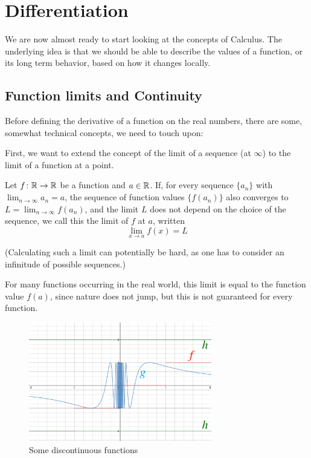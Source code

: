 \chapter{Differentiation}
\label{chdiff}

We are now almost ready to start looking at the concepts of Calculus. The
underlying idea is that we should be able to describe the values of a
function, or its long term behavior, based on how it changes locally.

\section{Function limits and Continuity}

Before defining the derivative of a function on the real numbers, 
there are some, somewhat
technical concepts, we need to touch upon:

First, we want to extend the concept of the limit of a sequence (at
$\infty$) to the limit of a function at a point.
\begin{defn}
Let $f\colon{\mathbb R}\to{\mathbb R}$ be a function and $a\in{\mathbb R}$. If, for every sequence
$\{a_n\}$ with $\lim_{n\to\infty} a_n=a$, the sequence of function values
$\{f(a_n)\}$ also converges to $L=\lim_{n\to\infty} f(a_n)$, and the limit
$L$ does not depend on the choice of the sequence, we call this the limit
of $f$ at $a$, written
\[
\lim_{x\to a} f(x)=L
\]
\end{defn}

(Calculating such a limit can potentially be hard, as one has to consider an
infinitude of possible sequences.)

For many functions occurring in the real world, this limit is equal to the
function value $f(a)$, since nature does not jump, but this is not
guaranteed for every function.

\begin{figure}[t]
\begin{center}
\includegraphics[width=8cm]{pic/DiscontFct.png}
\end{center}
\caption{Some discontinuous functions}
\label{figdiscont}
\end{figure}

